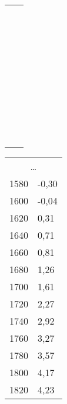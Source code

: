 \begin{table}[h]
\begin{tabular}{c|c}
&\\&\\&\\&\\&\\&\\&\\&\\&\\&\\&\\&\\&\\&\\&\\&\\&\\&\\&\\&\\&\\&\\&\\&\\&\\&\\&\\&\\&\\&\\&\\&\\&\\&\\&\\&\\&\\&\\&\\&\\
\end{tabular}
\begin{tabular}{rl}
\multicolumn{2}{c}{\dots}\\
1580	&	-0,30\\
1600	&	-0,04\\
1620	&	0,31\\
1640	&	0,71\\
1660	&	0,81\\
1680	&	1,26\\
1700	&	1,61\\
1720	&	2,27\\
1740	&	2,92\\
1760	&	3,27\\
1780	&	3,57\\
1800	&	4,17\\
1820	&	4,23\\

\end{tabular}
\end{table}

